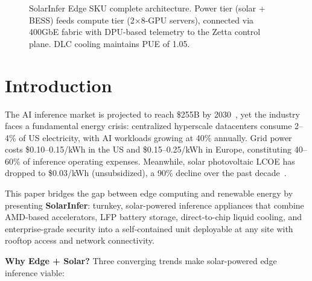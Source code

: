 \documentclass[conference,10pt,letterpaper]{IEEEtran}
\begin{document}
\begin{figure}[!t]
\caption{SolarInfer Edge SKU complete architecture. Power tier (solar + BESS) feeds compute tier (2$\times$8-GPU servers), connected via 400GbE fabric with DPU-based telemetry to the Zetta control plane. DLC cooling maintains PUE of 1.05.}
\label{fig:appliance}
\end{figure}

\section{Introduction}
\label{sec:intro}

The AI inference market is projected to reach \$255B by 2030~\cite{nrel2024lcoe}, yet the industry faces a fundamental energy crisis: centralized hyperscale datacenters consume 2--4\% of US electricity, with AI workloads growing at 40\% annually. Grid power costs \$0.10--0.15/kWh in the US and \$0.15--0.25/kWh in Europe, constituting 40--60\% of inference operating expenses. Meanwhile, solar photovoltaic LCOE has dropped to \$0.03/kWh (unsubsidized), a 90\% decline over the past decade~\cite{iea2025solar}.

This paper bridges the gap between edge computing and renewable energy by presenting \textbf{SolarInfer}: turnkey, solar-powered inference appliances that combine AMD-based accelerators, LFP battery storage, direct-to-chip liquid cooling, and enterprise-grade security into a self-contained unit deployable at any site with rooftop access and network connectivity.

\textbf{Why Edge + Solar?} Three converging trends make solar-powered edge inference viable:
\end{document}
